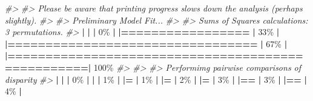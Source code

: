 \documentclass[
]{book}
\newenvironment{Shaded}{\begin{snugshade}}{\end{snugshade}}
\newcommand{\CommentTok}[1]{\textcolor[rgb]{0.56,0.35,0.01}{\textit{#1}}}
\newcommand{\DecValTok}[1]{\textcolor[rgb]{0.00,0.00,0.81}{#1}}
\newcommand{\ErrorTok}[1]{\textcolor[rgb]{0.64,0.00,0.00}{\textbf{#1}}}
\newcommand{\NormalTok}[1]{#1}
\newcommand{\SpecialCharTok}[1]{\textcolor[rgb]{0.81,0.36,0.00}{\textbf{#1}}}
\begin{document}
\begin{Shaded}
\begin{Highlighting}[]
\CommentTok{\#\textgreater{} }
\CommentTok{\#\textgreater{} Please be aware that printing progress slows down the analysis (perhaps slightly).}
\CommentTok{\#\textgreater{} }
\CommentTok{\#\textgreater{} Preliminary Model Fit...}
\CommentTok{\#\textgreater{} }
\CommentTok{\#\textgreater{} Sums of Squares calculations: 3 permutations.}
\CommentTok{\#\textgreater{} }
  \SpecialCharTok{|}                                                        
  \ErrorTok{|}                                                  \ErrorTok{|}   \DecValTok{0}\NormalTok{\%}
  \SpecialCharTok{|}                                                        
  \ErrorTok{|=================}                                 \ErrorTok{|}  \DecValTok{33}\NormalTok{\%}
  \SpecialCharTok{|}                                                        
  \ErrorTok{|=================================}                 \ErrorTok{|}  \DecValTok{67}\NormalTok{\%}
  \SpecialCharTok{|}                                                        
  \ErrorTok{|==================================================|} \DecValTok{100}\NormalTok{\%}
\CommentTok{\#\textgreater{} }
\CommentTok{\#\textgreater{} }
\CommentTok{\#\textgreater{} Performimg pairwise comparisons of disparity}
\CommentTok{\#\textgreater{} }
  \SpecialCharTok{|}                                                        
  \ErrorTok{|}                                                  \ErrorTok{|}   \DecValTok{0}\NormalTok{\%}
  \SpecialCharTok{|}                                                        
  \ErrorTok{|}                                                  \ErrorTok{|}   \DecValTok{1}\NormalTok{\%}
  \SpecialCharTok{|}                                                        
  \ErrorTok{|=}                                                 \ErrorTok{|}   \DecValTok{1}\NormalTok{\%}
  \SpecialCharTok{|}                                                        
  \ErrorTok{|=}                                                 \ErrorTok{|}   \DecValTok{2}\NormalTok{\%}
  \SpecialCharTok{|}                                                        
  \ErrorTok{|=}                                                 \ErrorTok{|}   \DecValTok{3}\NormalTok{\%}
  \SpecialCharTok{|}                                                        
  \ErrorTok{|==}                                                \ErrorTok{|}   \DecValTok{3}\NormalTok{\%}
  \SpecialCharTok{|}                                                        
  \ErrorTok{|==}                                                \ErrorTok{|}   \DecValTok{4}\NormalTok{\%}
  \SpecialCharTok{|}                                                        

\end{Highlighting}
\end{Shaded}
\end{document}

